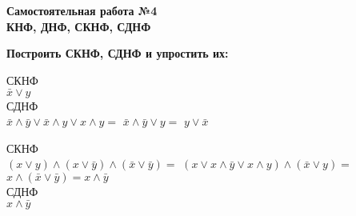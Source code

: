 



    \begin{center}
        \textbf{Самостоятельная работа №4\\КНФ, ДНФ, СКНФ, СДНФ}
    \end{center}

    \begin{center}
        \textbf{Построить СКНФ, СДНФ и упростить их:}
    \end{center}

    \begin{enumerate}
        \begin{spacing}{1.5}
            \item СКНФ\\
            $\bar x \vee y$\\
            СДНФ\\
            $\bar x \wedge \bar y \vee \bar x \wedge y \vee x \wedge y = $
            $\bar x \wedge \bar y \vee y = $
            $y \vee \bar x$

            \item СКНФ\\
            $(x \vee y) \wedge (x \vee \bar y) \wedge (\bar x \vee \bar y) = $
            $(x \vee x \wedge \bar y \vee x \wedge y) \wedge (\bar x \vee y) = $
            $x \wedge (\bar x \vee \bar y) = x \wedge \bar y$\\
            СДНФ\\
            $x \wedge \bar y$


\end{spacing}
\end{enumerate}
